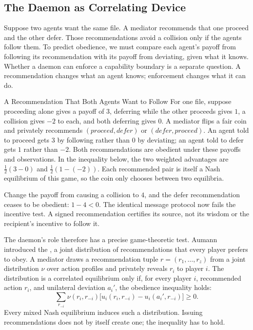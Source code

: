 \documentclass[11pt,a4paper]{article}
\theoremstyle{definition}
\theoremstyle{remark}
\begin{document}
\subsection{The Daemon as Correlating Device}\label{sec:correlating-device}
Suppose two agents want the same file. A mediator recommends that one proceed and the other defer. Those recommendations avoid a collision only if the agents follow them. To predict obedience, we must compare each agent's payoff from following its recommendation with its payoff from deviating, given what it knows. Whether a daemon can enforce a capability boundary is a separate question. A recommendation changes what an agent knows; enforcement changes what it can do.
\begin{pdexample}{A Recommendation That Both Agents Want to Follow}
For one file, suppose proceeding alone gives a payoff of $3$, deferring while
the other proceeds gives $1$, a collision gives $-2$ to each, and both
deferring gives $0$.
A mediator flips a fair coin and privately recommends $(\mathit{proceed},\mathit{defer})$ or $(\mathit{defer},\mathit{proceed})$.
An agent told to proceed gets $3$ by following rather than $0$ by deviating;
an agent told to defer gets $1$ rather than $-2$. Both recommendations are
obedient under these payoffs and observations. In the inequality below, the
two weighted advantages are $\tfrac12(3-0)$ and $\tfrac12(1-(-2))$. Each
recommended pair is itself a Nash equilibrium of this game, so the coin only
chooses between two equilibria.

Change the payoff from causing a collision to $4$, and the defer recommendation
ceases to be obedient: $1-4<0$. The identical message protocol now fails the
incentive test. A signed \mbox{recommendation} certifies its source, not its wisdom
or the recipient's incentive to follow it.
\end{pdexample}

%
The daemon's role therefore has a precise game-theoretic test. Aumann~ introduced the , a joint distribution of recommendations that every player prefers to obey. A mediator draws a recommendation tuple $r=(r_1,\ldots,r_z)$ from a joint distribution $\nu$ over action profiles and privately reveals $r_i$ to player $i$. The distribution is a correlated equilibrium only if, for every player $i$, recommended action $r_i$, and unilateral deviation $a_i'$, the obedience inequality holds:
\[
\sum_{r_{-i}} \nu(r_i,r_{-i})
\bigl[u_i(r_i,r_{-i})-u_i(a_i',r_{-i})\bigr] \ge 0.
\]
Every mixed Nash equilibrium induces such a distribution. Issuing recommendations does not by itself create one; the inequality has to hold.
\end{document}
